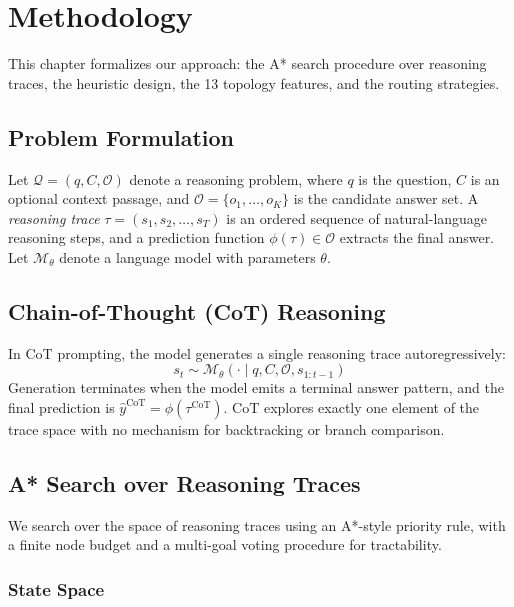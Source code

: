 \chapter{Methodology}

This chapter formalizes our approach: the A* search procedure over reasoning traces, the heuristic design, the 13 topology features, and the routing strategies.

\section{Problem Formulation}

Let $\mathcal{Q} = (q, C, \mathcal{O})$ denote a reasoning problem, where $q$ is the question, $C$ is an optional context passage, and $\mathcal{O} = \{o_1, \ldots, o_K\}$ is the candidate answer set. A \emph{reasoning trace} $\tau = (s_1, s_2, \ldots, s_T)$ is an ordered sequence of natural-language reasoning steps, and a prediction function $\phi(\tau) \in \mathcal{O}$ extracts the final answer. Let $\mathcal{M}_\theta$ denote a language model with parameters $\theta$.

\section{Chain-of-Thought (CoT) Reasoning}

In CoT prompting, the model generates a single reasoning trace autoregressively:
\begin{equation}
s_t \sim \mathcal{M}_\theta(\cdot \mid q, C, \mathcal{O}, s_{1:t-1})
\end{equation}
Generation terminates when the model emits a terminal answer pattern, and the final prediction is $\hat{y}^{\text{CoT}} = \phi(\tau^{\text{CoT}})$. CoT explores exactly one element of the trace space with no mechanism for backtracking or branch comparison.

\section{A* Search over Reasoning Traces}

We search over the space of reasoning traces using an A*-style priority rule, with a finite node budget and a multi-goal voting procedure for tractability.

\subsection{State Space}

